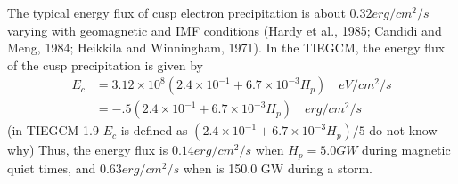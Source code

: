 %
The typical energy flux of cusp electron precipitation is about 
$0.32 erg/cm^2/s$ varying with geomagnetic and IMF conditions 
(Hardy et al., 1985; Candidi and Meng, 1984; Heikkila and Winningham, 1971). 
In the TIEGCM, the energy flux of the cusp precipitation is given by
%
\begin{equation}
  \begin{split}
      E_c & = 3.12 \times 10^8 (2.4 \times 10^{-1} + 6.7 \times 10^{-3}H_p) \quad  eV/cm^2/s \\
          & = -.5(2.4\times10^{-1} + 6.7\times 10^{-3} H_p) \quad  erg/cm^2/s
  \end{split}
    \label{eq:aurora_12}
\end{equation}
%   
(in TIEGCM 1.9 $E_c$ is defined as 
$(2.4 \times 10^{-1} + 6.7 \times 10^{-3}H_p)/5$ do not know why) 
Thus, the energy flux is $0.14 erg/cm^2/s$ when $H_p = 5.0 GW$ during  magnetic 
quiet times, and $0.63 erg/cm^2/s$ when  is 150.0 GW during a storm.
%
